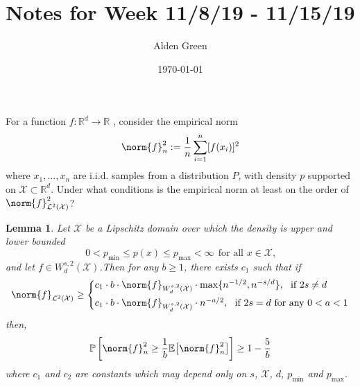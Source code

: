 \documentclass{article}
\newcommand{\Reals}{\mathbb{R}}
\newcommand{\1}{\mathbf{1}}
\newcommand{\Rd}{\Reals^d}
\newcommand{\Xset}{\mathcal{X}}
\newcommand{\Ebb}{\mathbb{E}}
\newcommand{\Leb}{\mathcal{L}}
\theoremstyle{alden}
\theoremstyle{aldenthm}
\newtheorem{lemma}{Lemma}
\theoremstyle{definition}
\theoremstyle{remark}
\begin{document}
\title{Notes for Week 11/8/19 - 11/15/19}
\author{Alden Green}
\date{\today}
\maketitle

For a function $f:\Rd \to \Reals$ , consider the empirical norm
\begin{equation*}
\norm{f}_n^2 := \frac{1}{n}\sum_{i = 1}^{n} [f(x_i)]^2 
\end{equation*}
where $x_1,\ldots,x_n$ are i.i.d. samples from a distribution $P$, with density $p$ supported on $\Xset \subset \Rd$. Under what conditions is the empirical norm at least on the order of $\norm{f}_{\Leb^2(\Xset)}^2$?

\begin{lemma}
	Let $\Xset$ be a Lipschitz domain over which the density is upper and lower bounded 
	\begin{equation*}
	0 < p_{\min} \leq p(x) \leq p_{\max} < \infty ~~\textrm{for all $x \in \Xset$,}
	\end{equation*}
	and let $f \in W_d^{s,2}(\Xset)$.Then for any $b \geq 1$, there exists $c_1$ such that if 
	\begin{equation}
	\norm{f}_{\Leb^2(\Xset)} \geq 
	\begin{cases*}
	c_1 \cdot b \cdot \norm{f}_{W_d^{s,2}(\Xset)} \cdot \max\{n^{-1/2},n^{-s/d}\},~~\textrm{if}~2s \neq d \\
	c_1 \cdot b \cdot \norm{f}_{W_d^{s,2}(\Xset)} \cdot n^{-a/2},~~\textrm{if}~ 2s = d ~\textrm{for any}~ 0 < a < 1
	\end{cases*}
	\end{equation}
	then,
	\begin{equation}
	\label{eqn:l2_to_empirical_norm_sobolev}
	\mathbb{P}\left[\norm{f}_n^2 \geq \frac{1}{b} \Ebb\bigl[\norm{f}_n^2\bigr]\right] \geq 1 - \frac{5}{b}
	\end{equation}
	where $c_1$ and $c_2$ are constants which may depend only on $s$, $\Xset$, $d$, $p_{\min}$ and $p_{\max}$.
\end{lemma}
\end{document}
